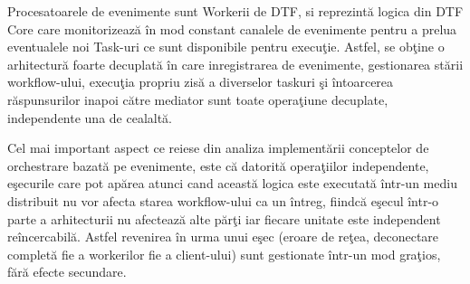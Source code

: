 \documentclass[a4paper,12pt]{report}
\begin{document}
\par Procesatoarele de evenimente sunt Workerii de DTF, si reprezintă logica din DTF Core care monitorizează în mod constant canalele de evenimente pentru a prelua eventualele noi Task-uri ce sunt disponibile pentru execuţie. Astfel, se obţine o arhitectură foarte decuplată în care inregistrarea de evenimente, gestionarea stării workflow-ului, execuţia propriu zisă a diverselor taskuri şi întoarcerea răspunsurilor inapoi către mediator sunt toate operaţiune decuplate, independente una de cealaltă.
\par Cel mai important aspect ce reiese din analiza implementării conceptelor de orchestrare bazată pe evenimente, este că datorită operaţiilor independente, eşecurile care pot apărea atunci cand această logica este executată într-un mediu distribuit nu vor afecta starea workflow-ului ca un întreg, fiindcă eşecul într-o parte a arhitecturii nu afectează alte părţi iar fiecare unitate este independent reîncercabilă. Astfel revenirea în urma unui eşec (eroare de reţea, deconectare completă fie a workerilor fie a client-ului) sunt gestionate într-un mod graţios, fără efecte secundare. 
\end{document}
